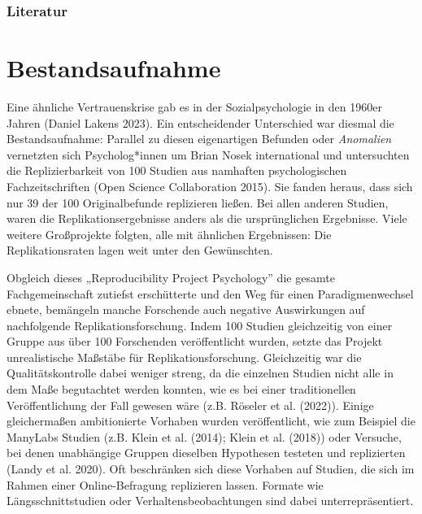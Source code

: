 \documentclass[
  letterpaper,
  DIV=11,
  numbers=noendperiod]{scrreprt}
\begin{document}
\subsection{Literatur}\label{literatur-4}

\chapter{Bestandsaufnahme}\label{bestandsaufnahme}

Eine ähnliche Vertrauenskrise gab es in der Sozialpsychologie in den
1960er Jahren (Daniel Lakens 2023). Ein entscheidender Unterschied war
diesmal die Bestandsaufnahme: Parallel zu diesen eigenartigen Befunden
oder \emph{Anomalien} vernetzten sich Psycholog*innen um Brian Nosek
international und untersuchten die Replizierbarkeit von 100 Studien aus
namhaften psychologischen Fachzeitschriften (Open Science Collaboration
2015). Sie fanden heraus, dass sich nur 39 der 100 Originalbefunde
replizieren ließen. Bei allen anderen Studien, waren die
Replikationsergebnisse anders als die ursprünglichen Ergebnisse. Viele
weitere Großprojekte folgten, alle mit ähnlichen Ergebnissen: Die
Replikationsraten lagen weit unter den Gewünschten.

\begin{tcolorbox}[enhanced jigsaw, left=2mm, colback=white, colframe=quarto-callout-note-color-frame, opacitybacktitle=0.6, opacityback=0, title=\textcolor{quarto-callout-note-color}{\faInfo}\hspace{0.5em}{Kritische Betrachtung der Open Science Collaboration, 2015}, toptitle=1mm, coltitle=black, colbacktitle=quarto-callout-note-color!10!white, titlerule=0mm, bottomtitle=1mm, leftrule=.75mm, breakable, rightrule=.15mm, bottomrule=.15mm, toprule=.15mm, arc=.35mm]

Obgleich dieses „Reproducibility Project Psychology'' die gesamte
Fachgemeinschaft zutiefst erschütterte und den Weg für einen
Paradigmenwechsel ebnete, bemängeln manche Forschende auch negative
Auswirkungen auf nachfolgende Replikationsforschung. Indem 100 Studien
gleichzeitig von einer Gruppe aus über 100 Forschenden veröffentlicht
wurden, setzte das Projekt unrealistische Maßstäbe für
Replikationsforschung. Gleichzeitig war die Qualitätskontrolle dabei
weniger streng, da die einzelnen Studien nicht alle in dem Maße
begutachtet werden konnten, wie es bei einer traditionellen
Veröffentlichung der Fall gewesen wäre (z.B. Röseler et al. (2022)).
Einige gleichermaßen ambitionierte Vorhaben wurden veröffentlicht, wie
zum Beispiel die ManyLabs Studien (z.B. Klein et al. (2014); Klein et
al. (2018)) oder Versuche, bei denen unabhängige Gruppen dieselben
Hypothesen testeten und replizierten (Landy et al. 2020). Oft
beschränken sich diese Vorhaben auf Studien, die sich im Rahmen einer
Online-Befragung replizieren lassen. Formate wie Längsschnittstudien
oder Verhaltensbeobachtungen sind dabei unterrepräsentiert.

\end{tcolorbox}
\end{document}
